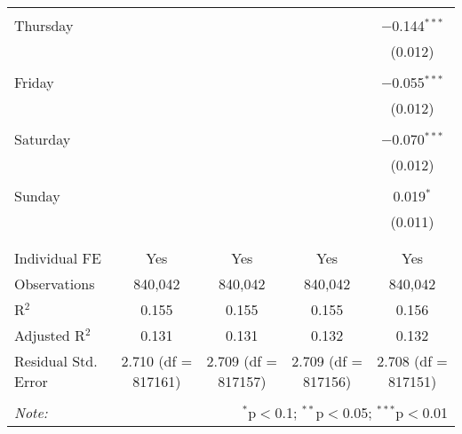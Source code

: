 \documentclass[
]{article}
\begin{document}
\begin{table}[!htbp]
{\begin{tabular}{@{\extracolsep{5pt}}lcccc}
  & & & & \\ 
 Thursday &  &  &  & $-$0.144$^{***}$ \\ 
  &  &  &  & (0.012) \\ 
  & & & & \\ 
 Friday &  &  &  & $-$0.055$^{***}$ \\ 
  &  &  &  & (0.012) \\ 
  & & & & \\ 
 Saturday &  &  &  & $-$0.070$^{***}$ \\ 
  &  &  &  & (0.012) \\ 
  & & & & \\ 
 Sunday &  &  &  & 0.019$^{*}$ \\ 
  &  &  &  & (0.011) \\ 
  & & & & \\ 
\hline \\[-1.8ex] 
Individual FE & Yes & Yes & Yes & Yes \\ 
Observations & 840,042 & 840,042 & 840,042 & 840,042 \\ 
R$^{2}$ & 0.155 & 0.155 & 0.155 & 0.156 \\ 
Adjusted R$^{2}$ & 0.131 & 0.131 & 0.132 & 0.132 \\ 
Residual Std. Error & 2.710 (df = 817161) & 2.709 (df = 817157) & 2.709 (df = 817156) & 2.708 (df = 817151) \\ 
\hline 
\hline \\[-1.8ex] 
\textit{Note:}  & \multicolumn{4}{r}{$^{*}$p$<$0.1; $^{**}$p$<$0.05; $^{***}$p$<$0.01} \\ 
\end{tabular}
} 
\end{table} 
\newpage
\end{document}
